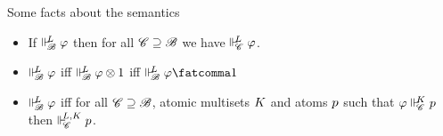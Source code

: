 \documentclass{beamer}
\begin{document}
\begin{frame}{Some facts about the semantics}
\begin{itemize}
\item If $\Vdash_{ \!\!\mathscr{B} }^{ \!\!{L} }\varphi$ then for all $\mathscr{C} \supseteq \mathscr{B}$ we have $\Vdash_{ \!\!\mathscr{C} }^{ \!\!{L} }\varphi$.
\vspace{5pt}
\item $\Vdash_{ \!\!\mathscr{B} }^{ \!\!{L} }\varphi$  iff $\Vdash_{ \!\!\mathscr{B} }^{ \!\!{L} }\varphi\otimes1$ iff $\suppM{\baseB}{\at{L}}\varphi\fatcomma\mtop$
\vspace{5pt}
\item $\Vdash_{ \!\!\mathscr{B} }^{ \!\!{L} }\varphi$ iff for all $\mathscr{C} \supseteq \mathscr{B}$, atomic multisets ${K}$ and atoms ${p}$ such that $\varphi \Vdash_{ \!\!\mathscr{C} }^{ \!\!{K} }{p}$ then $\Vdash_{ \!\!\mathscr{C} }^{ \!\!{L},{K} }{p}$. 
\end{itemize}
\end{frame}
\end{document}
